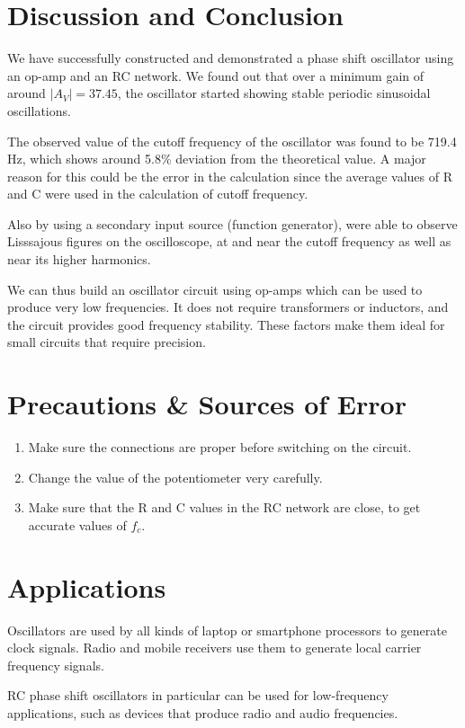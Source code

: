 \section{Discussion and Conclusion}

We have successfully constructed and demonstrated a phase shift oscillator using an op-amp and an RC network. We found out that over a minimum gain of around $|A_V|=37.45$, the oscillator started showing stable periodic sinusoidal oscillations.

The observed value of the cutoff frequency of the oscillator was found to be 719.4 Hz, which shows around 5.8\% deviation from the theoretical value. A major reason for this could be the error in the calculation since the average values of R and C were used in the calculation of cutoff frequency.

Also by using a secondary input source (function generator), were able to observe Lisssajous figures on the oscilloscope, at and near the cutoff frequency as well as near its higher harmonics.

We can thus build an oscillator circuit using op-amps which can be used to produce very low frequencies. It does not require transformers or inductors, and the circuit provides good frequency stability. These factors make them ideal for small circuits that require precision.

\section{Precautions \& Sources of Error}

\begin{enumerate}
    \item Make sure the connections are proper before switching on the circuit.
    \item Change the value of the potentiometer very carefully.
    \item Make sure that the R and C values in the RC network are close, to get accurate values of $f_c$.
\end{enumerate}

\section{Applications}
Oscillators are used by all kinds of laptop or smartphone processors to generate clock signals. Radio and mobile receivers use them to generate local carrier frequency signals.

RC phase shift oscillators in particular can be used for low-frequency applications, such as devices that produce radio and audio frequencies.